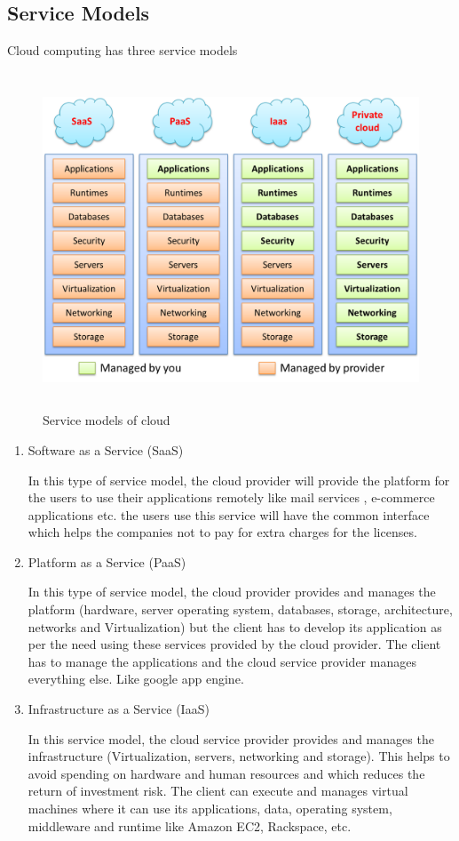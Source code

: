 \subsection{Service Models}
Cloud computing has three service models

\begin{figure}[h]
 \centering
 \includegraphics[width=14cm,height=10cm]{images/service_models2.png}
 \caption{Service models of cloud}%
 \label{fig:my_label}
\end{figure}

\par
\begin{enumerate}
    \item Software as a Service (SaaS)
    \par
        In this type of service model, the cloud provider will provide the platform for the users to use their applications remotely like mail services , e-commerce applications etc. the users use this service will have the common interface which helps the companies not to pay for extra charges for the licenses\cite{deploy}.%
    \item Platform as a Service (PaaS)
    \par
        In this type of service model, the cloud provider provides and manages the platform (hardware, server operating system, databases, storage, architecture, networks and Virtualization) but the client has to develop its application as per the need using these services provided by the cloud provider. The client has to manage the applications and the cloud service provider manages everything else. Like google app engine\cite{deploy}.%
    \item Infrastructure as a Service (IaaS)
    \par
        In this service model, the cloud service provider provides and manages the infrastructure (Virtualization, servers, networking and storage). This helps to avoid spending on hardware and human resources and which reduces the return of investment risk. The client can execute and manages virtual machines where it can use its applications, data, operating system, middleware and runtime like Amazon EC2, Rackspace, etc\cite{deploy}.
\end{enumerate}

